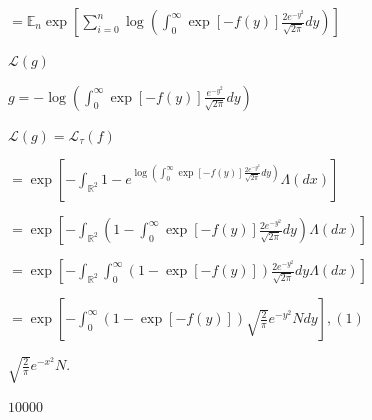 \documentclass{article}
\def\lthtmlcheckvsize{\ifdim\ht\sizebox<\vsize 
  \ifdim\wd\sizebox<\hsize\expandafter\hfill\fi \expandafter\vfill
  \else\expandafter\vss\fi}%
\begin{document}
{\newpage\clearpage
{}%
$\displaystyle = \mathbb{E}_n \exp \left[ \sum_{i= 0}^n \log \left(   \int_{0}^{\infty}  \exp \left[  -f(y)  \right] \frac{2e^{-y^2}}{\sqrt{2 \pi}} dy \right) \right]$%
\lthtmlindisplaymathZ
\lthtmlcheckvsize\clearpage}

{\newpage\clearpage
{}%
$ \mathcal{L}(g)$%
\lthtmlindisplaymathZ
\lthtmlcheckvsize\clearpage}

{\newpage\clearpage
{}%
$ g = - \log \left(   \int_{0}^{\infty}  \exp \left[  -f(y)  \right] \frac{e^{-y^2}}{\sqrt{2 \pi}} dy \right)  $%
\lthtmlindisplaymathZ
\lthtmlcheckvsize\clearpage}

{\newpage\clearpage
{}%
$\displaystyle \mathcal{L}(g) = \mathcal{L}_{\tau}(f)$%
\lthtmlindisplaymathZ
\lthtmlcheckvsize\clearpage}

{\newpage\clearpage
{}%
$\displaystyle = \exp \left[  -\int_{\mathbb{R}^2} 1 -  e^{\log \left(   \int_{0}^{\infty}  \exp \left[  -f(y)   \right] \frac{2e^{-y^2}}{\sqrt{2 \pi}} dy \right) }\Lambda(dx) \right]$%
\lthtmlindisplaymathZ
\lthtmlcheckvsize\clearpage}

{\newpage\clearpage
{}%
$\displaystyle = \exp \left[-\int_{\mathbb{R}^2} \left(1  -   \int_{0}^{\infty}  \exp [-f(y)] \frac{2e^{-y^2}}{\sqrt{2 \pi}}  dy \right)  \Lambda(dx)  \right]$%
\lthtmlindisplaymathZ
\lthtmlcheckvsize\clearpage}

{\newpage\clearpage
{}%
$\displaystyle = \exp \left[-\int_{\mathbb{R}^2}\int_{0}^{\infty} \left(1  -     \exp [-f(y)]   \right) \frac{2e^{-y^2}}{\sqrt{2 \pi}}dy  \Lambda(dx)  \right]$%
\lthtmlindisplaymathZ
\lthtmlcheckvsize\clearpage}

{\newpage\clearpage
{}%
$\displaystyle = \exp \left[-\int_{0}^{\infty} \left(1  -     \exp [-f(y)]   \right)  \sqrt{\frac{2}{\pi}}e^{-y^2} N dy    \right], (1)$%
\lthtmlindisplaymathZ
\lthtmlcheckvsize\clearpage}

{\newpage\clearpage
{}%
$ \sqrt{\frac{2}{\pi}}e^{-x^2} N.$%
\lthtmlindisplaymathZ
\lthtmlcheckvsize\clearpage}

{\newpage\clearpage
{}%
$ 10000$%
\lthtmlindisplaymathZ
\lthtmlcheckvsize\clearpage}
\end{document}
